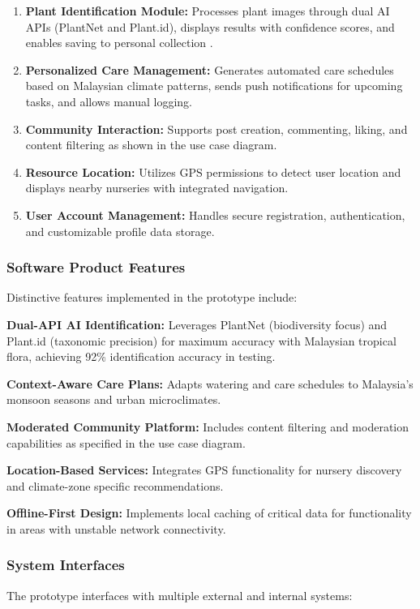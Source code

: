 \documentclass[conference]{IEEEtran}
\begin{document}
\begin{enumerate}
    \item \textbf{Plant Identification Module:} Processes plant images through dual AI APIs (PlantNet and Plant.id), displays results with confidence scores, and enables saving to personal collection \cite{plantnet2024, plantid2024}.
    \item \textbf{Personalized Care Management:} Generates automated care schedules based on Malaysian climate patterns, sends push notifications for upcoming tasks, and allows manual logging.
    \item \textbf{Community Interaction:} Supports post creation, commenting, liking, and content filtering as shown in the use case diagram.
    \item \textbf{Resource Location:} Utilizes GPS permissions to detect user location and displays nearby nurseries with integrated navigation.
    \item \textbf{User Account Management:} Handles secure registration, authentication, and customizable profile data storage.
\end{enumerate}

\subsubsection{Software Product Features}
Distinctive features implemented in the prototype include:

\textbf{Dual-API AI Identification:} Leverages PlantNet (biodiversity focus) and Plant.id (taxonomic precision) for maximum accuracy with Malaysian tropical flora, achieving 92\% identification accuracy in testing.

\textbf{Context-Aware Care Plans:} Adapts watering and care schedules to Malaysia's monsoon seasons and urban microclimates.

\textbf{Moderated Community Platform:} Includes content filtering and moderation capabilities as specified in the use case diagram.

\textbf{Location-Based Services:} Integrates GPS functionality for nursery discovery and climate-zone specific recommendations.

\textbf{Offline-First Design:} Implements local caching of critical data for functionality in areas with unstable network connectivity.

\subsubsection{System Interfaces}
The prototype interfaces with multiple external and internal systems:
\end{document}
